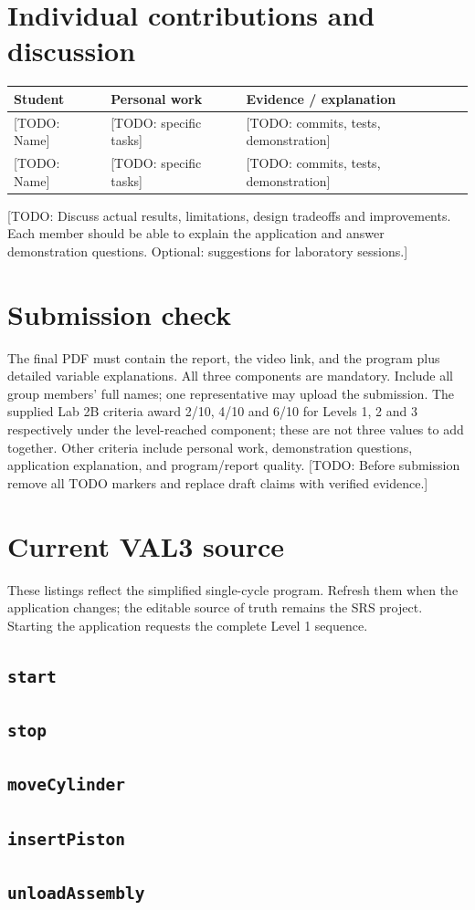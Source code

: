 \documentclass[12pt]{article}
\newcommand{\pending}[1]{\textcolor{blue!65!black}{[TODO: #1]}}
\begin{document}
\section{Individual contributions and discussion}
\begin{tabularx}{\linewidth}{@{}l X X@{}}
\toprule
Student & Personal work & Evidence / explanation\\
\midrule
\pending{Name} & \pending{specific tasks} & \pending{commits, tests, demonstration}\\
\pending{Name} & \pending{specific tasks} & \pending{commits, tests, demonstration}\\
\bottomrule
\end{tabularx}
\pending{Discuss actual results, limitations, design tradeoffs and improvements. Each member should be able to explain the application and answer demonstration questions. Optional: suggestions for laboratory sessions.}

\section{Submission check}
The final PDF must contain the report, the video link, and the program plus detailed variable explanations. All three components are mandatory. Include all group members' full names; one representative may upload the submission.
The supplied Lab 2B criteria award 2/10, 4/10 and 6/10 for Levels 1, 2 and 3 respectively under the level-reached component; these are not three values to add together. Other criteria include personal work, demonstration questions, application explanation, and program/report quality.
\pending{Before submission remove all TODO markers and replace draft claims with verified evidence.}

\appendix
\section{Current VAL3 source}\label{app:code}
These listings reflect the simplified single-cycle program. Refresh them when the application changes; the editable source of truth remains the SRS project. Starting the application requests the complete Level 1 sequence.
\subsection{\texttt{start}}

\subsection{\texttt{stop}}

\subsection{\texttt{moveCylinder}}

\subsection{\texttt{insertPiston}}

\subsection{\texttt{unloadAssembly}}

\end{document}
